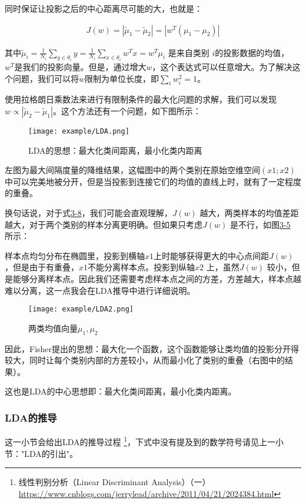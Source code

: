 同时保证让投影之后的中心距离尽可能的大，也就是：

\begin{eqnarray}
J(w) = |\tilde \mu_1 - \tilde \mu_2| = |w^T(\mu_1 - \mu_2)|
\end{eqnarray}

其中$\tilde \mu_i = \frac{1}{N_i}\sum_{y \in \theta_i} y = \frac{1}{N_i}\sum_{x \in \theta_i} w^T x = w^T \mu_i $ 是来自类别 $i$的投影数据的均值， $w^T$是我们的投影向量。但是，通过增大$w$，这个表达式可以任意增大。为了解决这个问题，我们可以将$w$限制为单位长度，即$\sum_i w_i^2 = 1$。

使用拉格朗日乘数法来进行有限制条件的最大化问题的求解，我们可以发现$ w \propto |\tilde \mu_2 - \tilde \mu_1|$。这个方法还有一个问题，如下图所示：

\begin{figure}[!htp]
\centering
\texttt{[image: example/LDA.png]}
\caption{LDA的思想：最大化类间距离，最小化类内距离}
\label{fig1:3-1}
\end{figure}

左图为最大间隔度量的降维结果，这幅图中的两个类别在原始空维空间$(x1;x2)$中可以完美地被分开，但是当投影到连接它们的均值的直线上时，就有了一定程度的重叠。

换句话说，对于式\href{}{3-8}，我们可能会直观理解，$J(w)$ 越大，两类样本的均值差距越大，对于两个类别的样本分离更明确。但如果只考虑$J(w)$ 是不行，如图\href{fig:3-5}{3-5} 所示：

样本点均匀分布在椭圆里，投影到横轴$x1$上时能够获得更大的中心点间距$J(w)$，但是由于有重叠，$x1$不能分离样本点。投影到纵轴$x2$ 上，虽然$J(w)$ 较小，但是能够分离样本点。因此我们还需要考虑样本点之间的方差，方差越大，样本点越难以分离，这一点我会在LDA推导中进行详细说明。

\begin{figure}[!htp]
\centering
\texttt{[image: example/LDA2.png]}
\caption{两类均值向量$\mu_1,\mu_2$}
\label{fig1:3-1}
\end{figure}

因此，Fisher提出的思想：最大化一个函数，这个函数能够让类均值的投影分开得较大，同时让每个类别内部的方差较小，从而最小化了类别的重叠（右图中的结果）。

这也是LDA的中心思想即：最大化类间距离，最小化类内距离。

\subsubsection{LDA的推导}

这一小节会给出LDA的推导过程 \footnote{线性判别分析（Linear Discriminant Analysis）（一） \quad \url{https://www.cnblogs.com/jerrylead/archive/2011/04/21/2024384.html}}，下式中没有提及到的数学符号请见上一小节："LDA的引出"。


